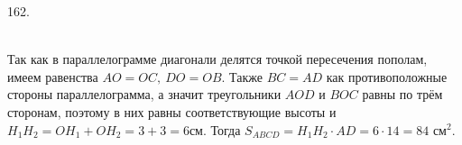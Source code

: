 162. \begin{figure}[ht!]
\end{figure}\\
Так как в параллелограмме диагонали делятся точкой пересечения пополам, имеем равенства $AO=OC,\ DO=OB.$ Также $BC=AD$ как противоположные стороны параллелограмма, а значит треугольники $AOD$ и $BOC$ равны по трём сторонам, поэтому в них равны соответствующие высоты и $H_1H_2=OH_1+OH_2=3+3=6$см. Тогда $S_{ABCD}=H_1H_2\cdot AD=6\cdot14=84\text{ см}^2.$
